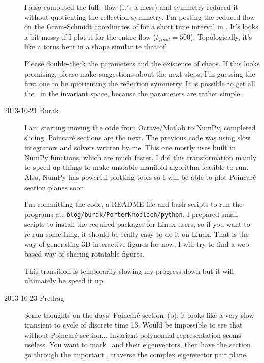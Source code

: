\begin{description}
I also computed the full \statesp\ flow (it's a mess) and symmetry reduced it
without quotienting the reflection symmetry. I'm posting the reduced flow on
the Gram-Schmidt coordinates of  for a short time
interval in .  It's looks a bit messy if
I plot it for the entire flow ($t_{final} = 500$). Topologically, it's like a
torus bent in a shape similar to that of 

Please double-check the parameters and the existence of chaos. If this looks
promising, please make suggestions about the next steps, I'm guessing the
first one to be quotienting the reflection symmetry. It is possible to get
all the \eqva\ in the invariant space, because the parameters are rather simple.



\item[2013-10-21 Burak]
I am starting moving the code from Octave/Matlab to NumPy, completed slicing,
Poincar\'e sections are the next. The previous code was using slow integrators
and solvers written by me. This one mostly uses built in NumPy functions,
which are much faster. I did this transformation mainly to speed up things
to make unstable manifold algorithm feasible to run. Also, NumPy has powerful
plotting tools so I will be able to plot Poincar\'e section planes soon.

I'm committing the code, a README file and bash scripts to run the programs at:
\texttt{blog/burak/PorterKnobloch/python}.
I prepared small scripts to install the required packages for Linux users,
so if you want to re-run something, it should be really easy to do it on Linux.
That is the way of generating 3D interactive figures for now, I will try to
find a web based way of sharing rotatable figures.

This transition is temporarily slowing my progress down but it will ultimately
be speed it up.

\item[2013-10-23 Predrag] Some thoughts on the days'
Poincar\'e section \,(b):
it looks like a very slow
transient to cycle of discrete time 13. Would be impossible to see
that without Poincar\'e section... Invariant polynomial representation
seems useless.
You want to mark \reqva\ and their eigenvectors, then have
the section go through the important \reqv, traverse the complex
eigenvector pair plane.


\end{description}
